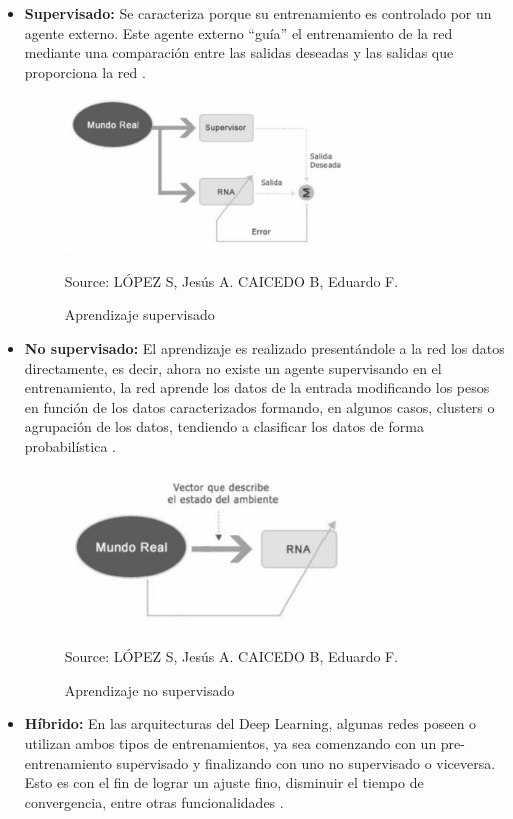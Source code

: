 \begin{itemize}
\item \textbf{Supervisado: } Se caracteriza porque su entrenamiento es controlado por un agente
externo. Este agente externo “guía” el entrenamiento de la red mediante una
comparación entre las salidas deseadas y las salidas que proporciona la red \cite{18restrepo2015aplicacion}.

\begin{figure}[H]
		\centering
		\includegraphics[width=75mm]{./Imagenes/grafico_supervisado.png}
		\caption{Aprendizaje supervisado}
		Source: LÓPEZ S, Jesús A. CAICEDO B, Eduardo F.
		\label{fig:grafico_supervisado}
\end{figure}



\item \textbf{No supervisado: }
El aprendizaje es realizado presentándole a la red los datos
directamente, es decir, ahora no existe un agente supervisando en el
entrenamiento, la red aprende los datos de la entrada modificando los pesos en
función de los datos caracterizados formando, en algunos casos, clusters o
agrupación de los datos, tendiendo a clasificar los datos de forma probabilística
\cite{18restrepo2015aplicacion}.

\begin{figure}[H]
		\centering
		\includegraphics[width=75mm]{./Imagenes/grafico_no_supervisado.png}
		\caption{Aprendizaje no supervisado}
		Source: LÓPEZ S, Jesús A. CAICEDO B, Eduardo F.
		\label{fig:grafico_no_supervisado}
\end{figure}

\item \textbf{Híbrido: }
En las arquitecturas del Deep Learning, algunas redes poseen o utilizan
ambos tipos de entrenamientos, ya sea comenzando con un pre-entrenamiento
supervisado y finalizando con uno no supervisado o viceversa. Esto es con el fin
de lograr un ajuste fino, disminuir el tiempo de convergencia, entre otras
funcionalidades \cite{18restrepo2015aplicacion}.
\end{itemize}
